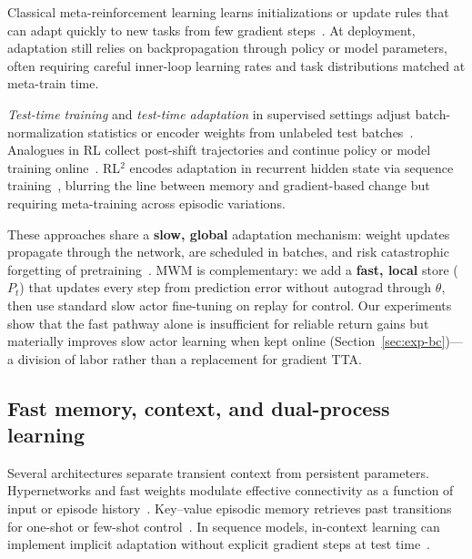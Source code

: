Classical meta-reinforcement learning learns initializations or update rules that can adapt quickly to new tasks from few gradient steps~\cite{finn2017model,duan2016rl}.
At deployment, adaptation still relies on backpropagation through policy or model parameters, often requiring careful inner-loop learning rates and task distributions matched at meta-train time.

\emph{Test-time training} and \emph{test-time adaptation} in supervised settings adjust batch-normalization statistics or encoder weights from unlabeled test batches~\cite{sun2020test,wang2021tent}.
Analogues in RL collect post-shift trajectories and continue policy or model training online~\cite{nagabandi2018learning,zintgraf2021fast,chua2018deep}.
RL$^2$ encodes adaptation in recurrent hidden state via sequence training~\cite{duan2016rl}, blurring the line between memory and gradient-based change but requiring meta-training across episodic variations.

These approaches share a \textbf{slow, global} adaptation mechanism: weight updates propagate through the network, are scheduled in batches, and risk catastrophic forgetting of pretraining~\cite{kirkpatrick2017overcoming}.
MWM is complementary: we add a \textbf{fast, local} store ($P_t$) that updates every step from prediction error without autograd through $\theta$, then use standard slow actor fine-tuning on replay for control.
Our experiments show that the fast pathway alone is insufficient for reliable return gains but materially improves slow actor learning when kept online (Section~\ref{sec:exp-bc})---a division of labor rather than a replacement for gradient TTA.

\subsection{Fast memory, context, and dual-process learning}
\label{sec:related-dual}

Several architectures separate transient context from persistent parameters.
Hypernetworks and fast weights modulate effective connectivity as a function of input or episode history~\cite{ha2017hypernetworks,ba2016using,mallya2018piggyback}.
Key--value episodic memory retrieves past transitions for one-shot or few-shot control~\cite{blundell2016model,pritzel2017neural}.
In sequence models, in-context learning can implement implicit adaptation without explicit gradient steps at test time~\cite{brown2020language}.

